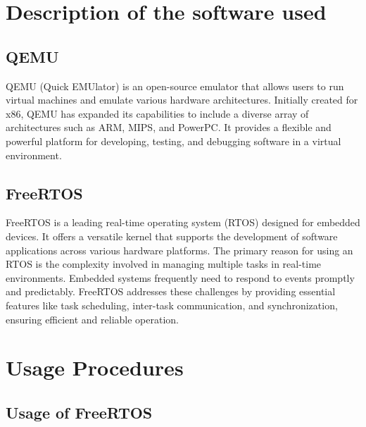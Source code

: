 \documentclass[a4paper, 10pt, oneside]{article} %
\begin{document}
\section{Description of the software used}
\subsection{QEMU}
QEMU (Quick EMUlator) is an open-source emulator that allows users to run virtual machines and emulate various hardware architectures. Initially created for x86, QEMU has expanded its capabilities to include a diverse array of architectures such as ARM, MIPS, and PowerPC. It provides a flexible and powerful platform for developing, testing, and debugging software in a virtual environment.

\subsection{FreeRTOS}
FreeRTOS is a leading real-time operating system (RTOS) designed for embedded devices. It offers a versatile kernel that supports the development of software applications across various hardware platforms. The primary reason for using an RTOS is the complexity involved in managing multiple tasks in real-time environments. Embedded systems frequently need to respond to events promptly and predictably. FreeRTOS addresses these challenges by providing essential features like task scheduling, inter-task communication, and synchronization, ensuring efficient and reliable operation.

\section{Usage Procedures}

\subsection{Usage of FreeRTOS}
\end{document}
